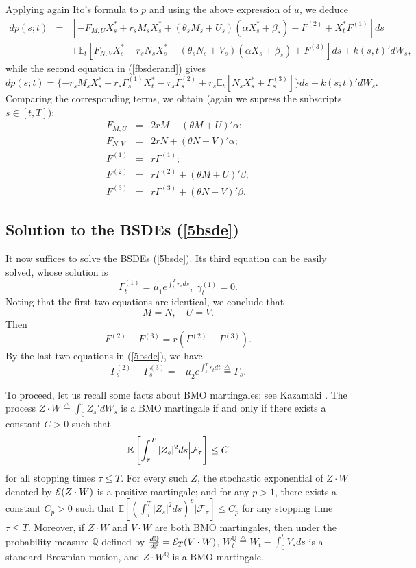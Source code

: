 \documentclass[final]{siamltex}
\begin{document}
Applying again Ito's formula to $p$ and using the above expression of $u$, we deduce
\begin{eqnarray*}
 dp(s;t)&=& [-F_{M,U} X^*_s +r_s M_s X^*_s+(\theta_s  M_s +U_s ) (\alpha X^*_s + \beta_s)-F^{(2)}+X^*_t F^{(1)}]ds\\
& & +\mathbb E_t[F_{N,V} X^*_s -r_s N_s X^*_s-(\theta_s  N_s +V_s ) (\alpha X_s + \beta_s)+F^{(3)}]ds+k(s,t)'dW_s,
\end{eqnarray*}
while the second equation in (\ref{fbsderand}) gives
$$dp(s;t)=\{ -r_sM_sX^*_s+r_s\Gamma^{(1)}_sX^*_t -r_s\Gamma^{(2)}_s+r_s\mathbb E_t[N_sX^*_s+\Gamma^{(3)}_s] \}ds+k(s;t)'dW_s.$$
Comparing the corresponding terms, we obtain (again we supress the subscripts $s\in [t,T]$):
\begin{eqnarray*}\label{5bsdecoef}
 F_{M,U}&=& 2rM+(\theta M+U)'\alpha;\\
F_{N,V}&=& 2rN+(\theta N+V)'\alpha;\\
F^{(1)}&=&r\Gamma^{(1)};\\
F^{(2)}&=&r\Gamma^{(2)}+(\theta M+U)'\beta;\\
F^{(3)}&=&r\Gamma^{(3)} + (\theta N+V)'\beta.
\end{eqnarray*}

\subsection{Solution to the BSDEs (\ref{5bsde}) }

It now suffices to solve the  BSDEs (\ref{5bsde}). Its third equation  can be easily solved, whose solution is
$$\Gamma^{(1)}_t=\mu_1e^{\int_t^Tr_sds}, \; \gamma^{(1)}_t=0.$$
Noting that the first two equations are identical,
 we conclude that
$$M=N, \quad U=V.$$
Then
$$F^{(2)}-F^{(3)}=r(\Gamma^{(2)}-\Gamma^{(3)}).$$
By the last two equations in (\ref{5bsde}), we have
$$\Gamma_s^{(2)}-\Gamma_s^{(3)}=-\mu_2 e^{\int_s^T r_t dt}{\stackrel{\triangle}{=}} \Gamma_s.$$

To proceed, let us recall some facts about BMO martingales; see Kazamaki \cite{Kazamaki}.
The process $Z\cdot W{\stackrel{\triangle}{=}}\int_0^\cdot Z_s'dW_s$ is a BMO martingale if and only if there exists a constant $C>0$ such that
$$\mathbb E\left[\int_\tau^T |Z_s|^2ds\Big| {\cal F}_\tau \right] \le C$$
for all stopping times $\tau\le T$. For every such $Z$, the stochastic exponential of $Z\cdot W$ denoted by ${\cal E}(Z\cdot W)$ is a positive martingale;
and for any $p>1$, there exists a constant $C_p>0$ such that
${\mathbb{E}\left[{\left(\int_\tau^T|Z_s|^2ds\right)^p\Big|{{\mathcal F}}_\tau}\right]}\le C_p$ for any stopping time $\tau\le T$.
Moreover, if $Z\cdot W$ and $V\cdot W$ are both BMO martingales, then under the probability measure ${\mathbb{Q}}$
defined by $\frac{d{\mathbb{Q}}}{d{\mathbb{P}}}={\cal E}_T(V\cdot W)$, $W^{\mathbb{Q}}_t{\stackrel{\triangle}{=}} W_t-\int_0^tV_sds$ is a standard Brownian motion, and $Z\cdot W^{\mathbb{Q}}$ is a BMO martingale.
\end{document}
